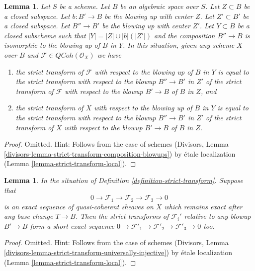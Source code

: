 \documentclass{stacks-project}
\theoremstyle{plain}
\newtheorem{lemma}[subsection]{Lemma}
\theoremstyle{definition}
\theoremstyle{remark}
\numberwithin{equation}{subsection}
\def\QCoh{\mathit{QCoh}}
\begin{document}
\begin{lemma}
\label{lemma-strict-transform-composition-blowups}
Let $S$ be a scheme. Let $B$ be an algebraic space over $S$.
Let $Z \subset B$ be a closed subspace.
Let $b : B' \to B$ be the blowing up with center $Z$.
Let $Z' \subset B'$ be a closed subspace.
Let $B'' \to B'$ be the blowing up with center $Z'$.
Let $Y \subset B$ be a closed subscheme such that
$|Y| = |Z| \cup |b|(|Z'|)$ and the composition $B'' \to B$
is isomorphic to the blowing up of $B$ in $Y$.
In this situation, given any scheme $X$ over $B$ and
$\mathcal{F} \in \QCoh(\mathcal{O}_X)$ we have
\begin{enumerate}
\item the strict transform of $\mathcal{F}$ with respect to the blowing
up of $B$ in $Y$ is equal to the strict transform with respect to the
blowup $B'' \to B'$ in $Z'$ of the strict transform of $\mathcal{F}$
with respect to the blowup $B' \to B$ of $B$ in $Z$, and
\item the strict transform of $X$ with respect to the blowing
up of $B$ in $Y$ is equal to the strict transform with respect to the
blowup $B'' \to B'$ in $Z'$ of the strict transform of $X$
with respect to the blowup $B' \to B$ of $B$ in $Z$.
\end{enumerate}
\end{lemma}

\begin{proof}
Omitted. Hint: Follows from the case of schemes
(Divisors, Lemma \ref{divisors-lemma-strict-transform-composition-blowups})
by \'etale localization (Lemma \ref{lemma-strict-transform-local}).
\end{proof}

\begin{lemma}
\label{lemma-strict-transform-universally-injective}
In the situation of Definition \ref{definition-strict-transform}.
Suppose that
$$
0 \to \mathcal{F}_1 \to \mathcal{F}_2 \to \mathcal{F}_3 \to 0
$$
is an exact sequence of quasi-coherent sheaves on $X$ which remains
exact after any base change $T \to B$. Then the strict transforms of
$\mathcal{F}_i'$ relative to any blowup $B' \to B$
form a short exact sequence
$0 \to \mathcal{F}'_1 \to \mathcal{F}'_2 \to \mathcal{F}'_3 \to 0$ too.
\end{lemma}

\begin{proof}
Omitted. Hint: Follows from the case of schemes
(Divisors, Lemma \ref{divisors-lemma-strict-transform-universally-injective})
by \'etale localization (Lemma \ref{lemma-strict-transform-local}).
\end{proof}
\end{document}
